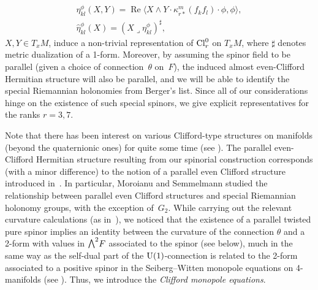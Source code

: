 \documentclass[10pt,a4paper]{amsart}
\newcommand{\ext}{\raise1pt\hbox{\small$\bigwedge$}}
\numberwithin{equation}{section}
\begin{document}
\begin{gather*}
 \eta_{kl}^\phi(X,Y) = \operatorname{Re}\langle X\wedge Y\cdot \kappa_{r*}^m(f_kf_l)\cdot \phi,\phi\rangle ,\\
 \hat\eta_{kl}^\phi(X) = (X\lrcorner\eta_{kl}^\phi)^\sharp,
\end{gather*}
$X,Y\in T_xM$, induce a non-trivial representation of ${\rm Cl}_r^0$ on $T_xM$, where $\sharp$ denotes metric dualization of a 1-form.
Moreover, by assuming the spinor field to be parallel (given a choice of connection~$\theta$ on~$F$),
the induced almost even-Clifford Hermitian structure will also be parallel,
and we will be able to identify the special Riemannian holonomies from Berger's list.
Since all of our considerations hinge on the existence of such special spinors, we give
explicit representatives for the ranks $r=3 , 7$.

Note that there has been interest on various Clifford-type structures on manifolds (beyond the quaternionic ones) for quite some time (see \cite{AGH,AH,AHS,Barberis,Burdujan1,Burdujan2,Console, Ferus,Friedrich1,GH,Moroianu-Hadfield, Joyce0,Lazaroiu1,Lazaroiu2,Moroianu-Pilca,Moroianu-Semmelmann,Nikolayevsky,Parton0,
Parton1, Parton2, Piccinni, Spindel}). The parallel even-Clifford Hermitian structure resulting from our spinorial construction corresponds (with a minor difference) to the notion of a parallel even Clifford structure introduced in~\cite{Moroianu-Semmelmann}. In particular, Moroianu and Semmelmann studied the relationship between parallel even Clifford structures and special Riemannian holonomy groups, with the exception of~$G_2$. While carrying out the relevant curvature calculations (as in~\cite{Moroianu-Semmelmann}), we noticed that the existence of a parallel twisted pure spinor implies an identity between the curvature of the connection $\theta$
and a 2-form with values in $\ext^2 F$ associated to the spinor (see below), much in the same way as the self-dual part of the ${\rm U}(1)$-connection is related to the
2-form associated to a positive spinor in the Seiberg--Witten monopole equations on 4-manifolds (see \cite{Morgan, Nicolaescu, Witten}). Thus, we introduce the {\em Clifford monopole equations}.
\end{document}
